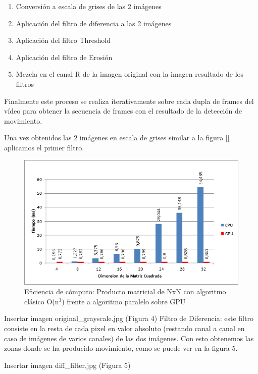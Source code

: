 \documentclass[twoside]{article}
\begin{document}
\begin{enumerate}
   \item Conversión a escala de grises de las 2 imágenes
   \item Aplicación del filtro de diferencia a las 2 imágenes
   \item Aplicación del filtro Threshold
   \item Aplicación del filtro de Erosión
   \item Mezcla en el canal R de la imagen original con la imagen resultado de los filtros
\end{enumerate}

Finalmente este proceso se realiza iterativamente sobre cada dupla de frames del vídeo para obtener la secuencia de frames con el resultado de la detección de movimiento. 

Una vez obtenidos las 2 imágenes en escala de grises similar a la figura \ref{} aplicamos el primer filtro.

\begin{figure}
   \begin{center}
      \includegraphics[width=.9\textwidth]{cpu-gpu.png}
      \caption{\label{fig:cpu-gpu}Eficiencia de cómputo: Producto matricial de NxN con algoritmo clásico O(n$^{3}$) frente a algoritmo paralelo sobre GPU}
   \end{center}
\end{figure}

Insertar imagen original_grayscale.jpg (Figura 4)
   Filtro de Diferencia: este filtro consiste en la resta de cada pixel en valor absoluto (restando canal a canal en caso de imágenes de varios canales) de las dos imágenes. Con esto obtenemos las zonas donde se ha producido movimiento, como se puede ver en la figura 5.

Insertar imagen diff_filter.jpg (Figura 5)
\end{document}
